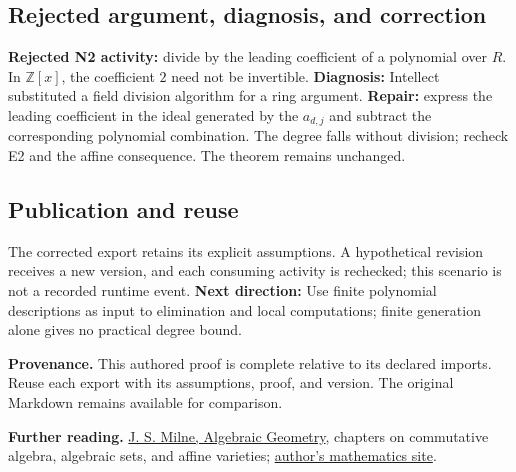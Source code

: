 \documentclass[preprint,12pt,aps,pra,showkeys,amsmath,amssymb,superscriptaddress,floatfix]{revtex4-2}
\theoremstyle{definition}
\theoremstyle{remark}
\begin{document}
\subsection{Rejected argument, diagnosis, and correction}
\textbf{Rejected N2 activity:} divide by the leading coefficient of a
polynomial over \(R\). In \(\mathbb Z[x]\), the coefficient \(2\) need
not be invertible. \textbf{Diagnosis:} Intellect substituted a field
division algorithm for a ring argument. \textbf{Repair:} express the
leading coefficient in the ideal generated by the \(a_{d,j}\) and
subtract the corresponding polynomial combination. The degree falls
without division; recheck E2 and the affine consequence. The theorem
remains unchanged.

\subsection{Publication and reuse}
The corrected export retains its explicit assumptions. A hypothetical
revision receives a new version, and each consuming activity is
rechecked; this scenario is not a recorded runtime event. \textbf{Next
direction:} Use finite polynomial descriptions as input to elimination
and local computations; finite generation alone gives no practical
degree bound.

\par\medskip\begingroup\small\linespread{1.0}\selectfont\noindent\textbf{Provenance.} This authored proof is complete relative to its declared imports. Reuse
each export with its assumptions, proof, and version. The original
Markdown remains available for comparison.
\par\endgroup

\par\smallskip\begingroup\small\linespread{1.0}\selectfont\noindent\textbf{Further reading.} \href{https://www.jmilne.org/math/CourseNotes/ag.html}{J. S. Milne,
Algebraic Geometry}, chapters on commutative algebra, algebraic sets,
and affine varieties; \href{https://www.jmilne.org/math/}{author's
mathematics site}.\par\endgroup
\end{document}
